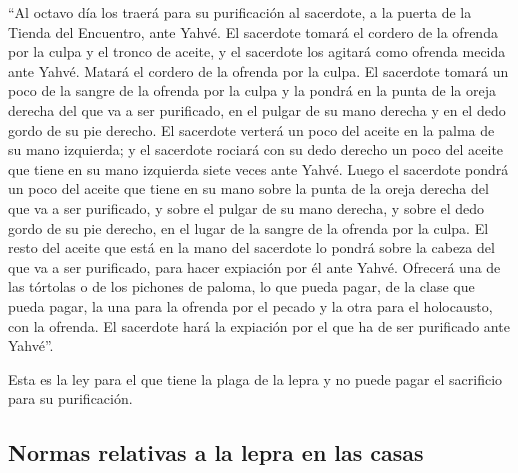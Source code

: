 \begin{paracol}{2}
 ``Al octavo día los traerá para su purificación al
sacerdote, a la puerta de la Tienda del Encuentro, ante Yahvé.
 El sacerdote tomará el cordero de la ofrenda por la
culpa y el tronco de aceite, y el sacerdote los agitará como ofrenda
mecida ante Yahvé.  Matará el cordero de la ofrenda por
la culpa. El sacerdote tomará un poco de la sangre de la ofrenda por la
culpa y la pondrá en la punta de la oreja derecha del que va a ser
purificado, en el pulgar de su mano derecha y en el dedo gordo de su pie
derecho.  El sacerdote verterá un poco del aceite en la
palma de su mano izquierda;  y el sacerdote rociará con
su dedo derecho un poco del aceite que tiene en su mano izquierda siete
veces ante Yahvé.  Luego el sacerdote pondrá un poco del
aceite que tiene en su mano sobre la punta de la oreja derecha del que
va a ser purificado, y sobre el pulgar de su mano derecha, y sobre el
dedo gordo de su pie derecho, en el lugar de la sangre de la ofrenda por
la culpa.  El resto del aceite que está en la mano del
sacerdote lo pondrá sobre la cabeza del que va a ser purificado, para
hacer expiación por él ante Yahvé.  Ofrecerá una de las
tórtolas o de los pichones de paloma, lo que pueda pagar,
 de la clase que pueda pagar, la una para la ofrenda por
el pecado y la otra para el holocausto, con la ofrenda. El sacerdote
hará la expiación por el que ha de ser purificado ante Yahvé''.

 Esta es la ley para el que tiene la plaga de la lepra y
no puede pagar el sacrificio para su purificación.

\hypertarget{normas-relativas-a-la-lepra-en-las-casas}{%
\subsection{Normas relativas a la lepra en las
casas}\label{normas-relativas-a-la-lepra-en-las-casas}}


\end{paracol}

